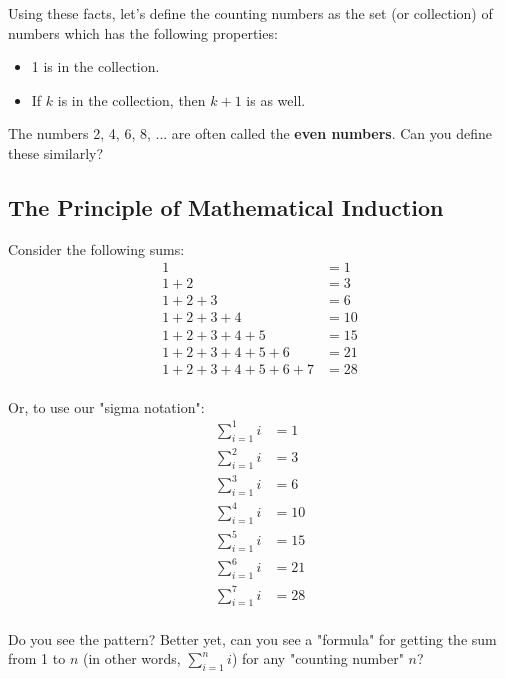 Using these facts, let's define the counting numbers as the set (or collection) of numbers which has the following properties:

\begin{itemize}
\item 1 is in the collection.
\item If $k$ is in the collection, then $k+1$ is as well. 
\end{itemize}

\begin{exercise}
The numbers 2, 4, 6, 8, ... are often called the \textbf{even numbers}. Can you define these similarly?
\end{exercise}


\subsection{The Principle of Mathematical Induction}

Consider the following sums:
\begin{align*}
1 &= 1 \\
1 + 2 &= 3 \\
1 + 2 + 3 &= 6 \\
1 + 2 + 3 + 4 &= 10 \\
1 + 2 + 3 + 4 + 5 &= 15 \\
1 + 2 + 3 + 4 + 5 + 6 &= 21 \\
1 + 2 + 3 + 4 + 5 + 6 + 7 &= 28 \\
\end{align*}

Or, to use our "sigma notation":
\begin{align*}
\sum_{i=1}^1 i &= 1 \\
\sum_{i=1}^2 i &= 3 \\
\sum_{i=1}^3 i &= 6 \\
\sum_{i=1}^4 i &= 10 \\
\sum_{i=1}^5 i &= 15 \\
\sum_{i=1}^6 i &= 21 \\
\sum_{i=1}^7 i &= 28 \\
\end{align*}

Do you see the pattern? Better yet, can you see a "formula" for getting the sum from 1 to $n$ (in other words, $\sum_{i=1}^n i$) for any "counting number" $n$?

\newpage

